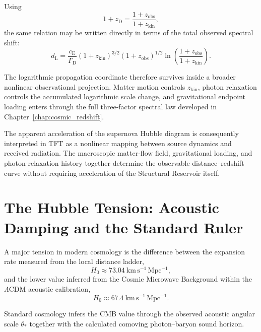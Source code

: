 Using
\begin{equation}
    1+z_{\mathrm D}
    =
    \frac{1+z_{\mathrm{obs}}}
    {1+z_{\mathrm{kin}}},
\end{equation}
the same relation may be written directly in terms of the total observed spectral shift:
\begin{equation}
    d_{\mathrm L}
    =
    \frac{c_{\mathrm E}}{\Gamma_{\mathrm D}}
    (1+z_{\mathrm{kin}})^{3/2}
    (1+z_{\mathrm{obs}})^{1/2}
    \ln\left(
        \frac{1+z_{\mathrm{obs}}}
        {1+z_{\mathrm{kin}}}
    \right).
\end{equation}

The logarithmic propagation coordinate therefore survives inside a broader nonlinear observational projection. Matter motion controls $z_{\mathrm{kin}}$, photon relaxation controls the accumulated logarithmic scale change, and gravitational endpoint loading enters through the full three-factor spectral law developed in Chapter~\ref*{chap:cosmic_redshift}.

The apparent acceleration of the supernova Hubble diagram is consequently interpreted in TFT as a nonlinear mapping between source dynamics and received radiation. The macroscopic matter-flow field, gravitational loading, and photon-relaxation history together determine the observable distance--redshift curve without requiring acceleration of the Structural Reservoir itself.


\section{The Hubble Tension: Acoustic Damping and the Standard Ruler}
\label{sec:hubble_tension_acoustic_damping}

A major tension in modern cosmology is the difference between the expansion rate measured from the local distance ladder,
\begin{equation}
    H_0
    \approx
    73.04\ \mathrm{km\,s^{-1}\,Mpc^{-1}},
\end{equation}
and the lower value inferred from the Cosmic Microwave Background within the $\Lambda$CDM acoustic calibration,
\begin{equation}
    H_0
    \approx
    67.4\ \mathrm{km\,s^{-1}\,Mpc^{-1}}.
\end{equation}

Standard cosmology infers the CMB value through the observed acoustic angular scale $\theta_*$ together with the calculated comoving photon--baryon sound horizon.

